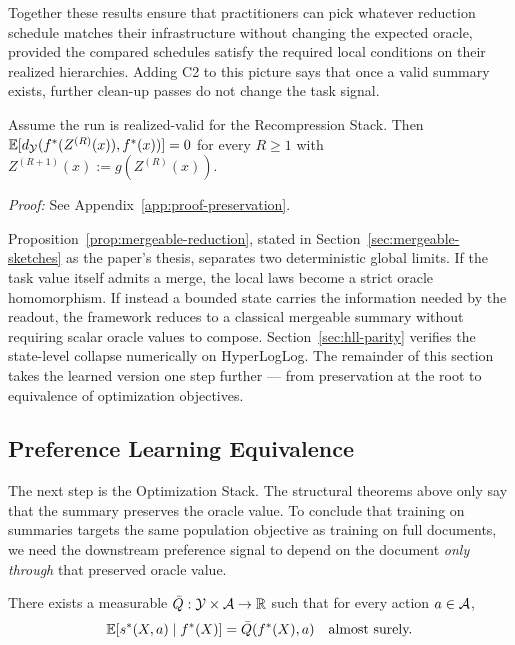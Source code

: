 Together these results ensure that practitioners can pick whatever reduction schedule matches their infrastructure without changing the expected oracle, provided the compared schedules satisfy the required local conditions on their realized hierarchies. Adding C2 to this picture says that once a valid summary exists, further clean-up passes do not change the task signal.

\begin{theorem}\label{thm:multi-round}
Assume the run is realized-valid for the Recompression Stack. Then $\mathbb{E}[d_{\mathcal{Y}}(f^\ast(Z^{(R)}(x)), f^\ast(x))] = 0$ for every $R \geq 1$ with $Z^{(R+1)}(x) := g(Z^{(R)}(x))$.
\end{theorem}

\noindent\textit{Proof:} See Appendix~\ref{app:proof-preservation}.

Proposition~\ref{prop:mergeable-reduction}, stated in Section~\ref{sec:mergeable-sketches} as the paper's thesis, separates two deterministic global limits. If the task value itself admits a merge, the local laws become a strict oracle homomorphism. If instead a bounded state carries the information needed by the readout, the framework reduces to a classical mergeable summary without requiring scalar oracle values to compose. Section~\ref{sec:hll-parity} verifies the state-level collapse numerically on HyperLogLog. The remainder of this section takes the learned version one step further --- from preservation at the root to equivalence of optimization objectives.

\subsection{Preference Learning Equivalence}

The next step is the Optimization Stack. The structural theorems above only say that the summary preserves the oracle value. To conclude that training on summaries targets the same population objective as training on full documents, we need the downstream preference signal to depend on the document \emph{only through} that preserved oracle value.

\begin{assumption}\label{ass:CF}
There exists a measurable $\bar{Q}: \mathcal{Y} \times \mathcal{A} \to \mathbb{R}$ such that for every action $a \in \mathcal{A}$,
\[
\mathbb{E}\!\left[s^\ast(X, a) \mid f^\ast(X)\right] = \bar{Q}(f^\ast(X), a) \quad \text{almost surely.}
\]
\end{assumption}

